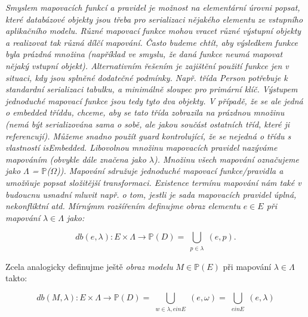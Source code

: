 \documentclass{article}
\begin{document}
\textit{
Smyslem mapovacích funkcí a pravidel je možnost na elementární úrovni
popsat, které databázové objekty jsou třeba pro serializaci nějakého
elementu ze vstupního aplikačního modelu. Různé mapovací funkce mohou vracet
různé výstupní objekty a realizovat tak různá dílčí mapování. Často
budeme chtít, aby výsledkem funkce byla prázdná množina (například ve
smyslu, že daná funkce neumá mapovat nějaký vstupní objekt). Alternativním
řešením je zajištění použití funkce jen v situaci, kdy jsou splněné dodatečné
podmínky. Např. třída Person potřebuje k standardní serializaci tabulku, a
minimálně sloupec pro primární klíč. Výstupem jednoduché mapovací funkce jsou
tedy tyto dva objekty. V případě, že se ale jedná o embedded tříddu,
chceme, aby se tato třída zobrazila na prázdnou množinu (nemá být
serializována sama o sobě, ale jakou součást ostatních tříd, které ji
referencují). Můžeme snadno použít guard kontrolující, že se nejedná o
třídu s vlastností isEmbedded. Libovolnou množinu mapovacích pravidel
nazýváme mapováním (obvykle dále značena jako $\lambda$). Množinu všech
mapování označujeme jako $\Lambda$ = $\mathbb{P}$($\Omega$)). Mapování
sdružuje jednoduché mapovací funkce/pravidla a umožňuje popsat
složitější transformaci. Existence termínu mapování nám také v budoucnu
usnadní mluvit např. o tom, jestli je sada mapovacích pravidel úplná,
nekonfliktní atd. Mírnýmm rozšířením definujme obraz elementu $e \in E$ při
mapování $\lambda \in \Lambda$ jako:
}

$$db(e, \lambda): E \times \Lambda \to \mathbb{P}(D) = \bigcup_{\substack{
  p \in \lambda
  }}
  (e,p).$$
  
Zcela analogicky definujme ještě \textit{obraz modelu} $M \in \mathbb{P}(E)$
při mapování $\lambda \in \Lambda$ takto:

$$db(M, \lambda): E \times \Lambda \to \mathbb{P}(D) = \bigcup_{\substack{
  w \in \lambda, e in E
  }}
  (e,\omega) = 
  \bigcup_{\substack{
  e in E
  }}(e,\lambda)$$
\end{document}
